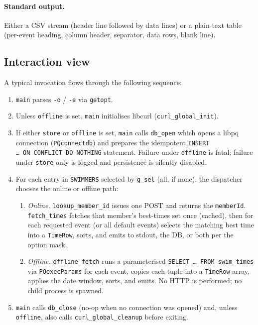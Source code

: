 \documentclass[12pt]{article}
\newcommand{\code}[1]{\texttt{#1}}
\begin{document}
\begin{description}[style=nextline]
\paragraph{Standard output.}
Either a CSV stream (header line followed by data lines) or a
plain-text table (per-event heading, column header, separator,
data rows, blank line).

\subsection{Interaction view}

A typical invocation flows through the following sequence:

\begin{enumerate}
  \item \code{main} parses \code{-o} / \code{-e} via \code{getopt}.
  \item Unless \code{offline} is set, \code{main} initialises
        libcurl (\code{curl\_global\_init}).
  \item If either \code{store} or \code{offline} is set,
        \code{main} calls \code{db\_open} which opens a libpq
        connection (\code{PQconnectdb}) and prepares the
        idempotent \code{INSERT \dots\ ON~CONFLICT~DO~NOTHING}
        statement.  Failure under \code{offline} is fatal;
        failure under \code{store} only is logged and persistence
        is silently disabled.
  \item For each entry in \code{SWIMMERS} selected by
        \code{g\_sel} (all, if none), the dispatcher chooses the
        online or offline path:
        \begin{enumerate}
          \item \emph{Online.} \code{lookup\_member\_id} issues
                one POST and returns the \code{memberId}.
                \code{fetch\_times} fetches that member's best-times
                set once (cached), then for each requested event (or
                all default events) selects the matching best time
                into a \code{TimeRow}, sorts, and emits to stdout,
                the DB, or both per the option mask.
          \item \emph{Offline.} \code{offline\_fetch} runs a
                parameterised \texttt{SELECT \dots\ FROM swim\_times}
                via \code{PQexecParams} for each event, copies
                each tuple into a \code{TimeRow} array, applies
                the date window, sorts, and emits.  No HTTP is
                performed; no child process is spawned.
        \end{enumerate}
  \item \code{main} calls \code{db\_close} (no-op when no
        connection was opened) and, unless \code{offline}, also
        calls \code{curl\_global\_cleanup} before exiting.
\end{enumerate}


\end{description}
\end{document}
